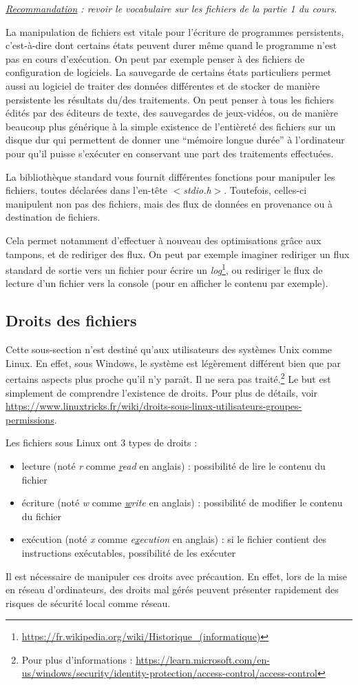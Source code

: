 \documentclass[../../../main.tex]{subfiles}
\begin{document}
\textit{\underline{Recommandation} : revoir le vocabulaire sur les fichiers de la partie 1 du cours}.
 
La manipulation de fichiers est vitale pour l'écriture de programmes persistents, c'est-à-dire dont certains états peuvent durer même quand le programme n'est pas en cours d'exécution. On peut par exemple penser à des fichiers de configuration de logiciels. La sauvegarde de certains états particuliers permet aussi au logiciel de traiter des données différentes et de stocker de manière persistente les résultats du/des traitements. On peut penser à tous les fichiers édités par des éditeurs de texte, des sauvegardes de jeux-vidéos, ou de manière beaucoup plus générique à la simple existence de l'entièreté des fichiers sur un disque dur qui permettent de donner une ``mémoire longue durée'' à l'ordinateur pour qu'il puisse s'exécuter en conservant une part des traitements effectuées.
 
La bibliothèque standard vous fournit différentes fonctions pour manipuler les fichiers, toutes déclarées dans l’en-tête \textit{$<$stdio.h$>$}. Toutefois, celles-ci manipulent non pas des fichiers, mais des flux de données en provenance ou à destination de fichiers.
 
Cela permet notamment d'effectuer à nouveau des optimisations grâce aux tampons, et de rediriger des flux. On peut par exemple imaginer rediriger un flux standard de sortie vers un fichier pour écrire un \textit{log}\footnote{\url{https://fr.wikipedia.org/wiki/Historique_(informatique)}}, ou rediriger le flux de lecture d'un fichier vers la console (pour en afficher le contenu par exemple).
\subsection{Droits des fichiers}
Cette sous-section n'est destiné qu'aux utilisateurs des systèmes Unix comme Linux. En effet, sous Windows, le système est légèrement différent bien que par certains aspects plus proche qu'il n'y paraît. Il ne sera pas traité.\footnote{Pour plus d'informations : \url{https://learn.microsoft.com/en-us/windows/security/identity-protection/access-control/access-control}} Le but est simplement de comprendre l'existence de droits. Pour plus de détails, voir \url{https://www.linuxtricks.fr/wiki/droits-sous-linux-utilisateurs-groupes-permissions}.
 
Les fichiers sous Linux ont 3 types de droits :
\begin{itemize}
	\item lecture (noté \textit{r} comme \textit{\underline{r}ead} en anglais) : possibilité de lire le contenu du fichier
	\item écriture (noté \textit{w} comme \textit{\underline{w}rite} en anglais) : possibilité de modifier le contenu du fichier
	\item exécution (noté \textit{x} comme \textit{e\underline{x}ecution} en anglais) : si le fichier contient des instructions exécutables, possibilité de les exécuter
\end{itemize}
Il est nécessaire de manipuler ces droits avec précaution. En effet, lors de la mise en réseau d'ordinateurs, des droits mal gérés peuvent présenter rapidement des risques de sécurité local comme réseau.
 
\end{document}
